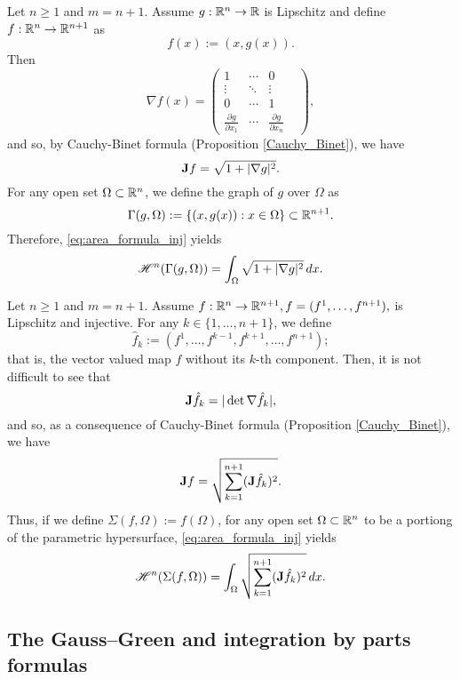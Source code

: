 \begin{example}
Let $n \ge 1$ and $m = n + 1$. Assume $g: \mathbb{R}^{n} \to \mathbb{R}$ is Lipschitz and define $f: \mathbb{R}^{n} \to \mathbb{R}^{n + 1}$ as $$f(x) := (x, g(x)).$$
Then
\[\nabla f(x) = \begin{pmatrix} 1 & \cdots & 0 & \\ \vdots & \ddots & \vdots \\ 
0 & \cdots & 1 & \\ \frac{\partial g}{\partial x_{1}} & \cdots & \frac{\partial g}{\partial x_{n}} & \end{pmatrix},\]
and so, by Cauchy-Binet formula (Proposition \ref{Cauchy_Binet}), we have
\begin{equation*}
{\bf J} f = \sqrt{1 + |\nabla g|^2}.
\end{equation*}
For any open set $\Omega \subset \mathbb{R}^{n}$, we define the graph of $g$ over $\Omega$ as
$$ \Gamma(g, \Omega) := \{ (x, g(x)) : x \in \Omega \} \subset \mathbb{R}^{n + 1}.$$
Therefore, \eqref{eq:area_formula_inj} yields
\begin{equation*}
\mathscr{H}^{n}(\Gamma(g, \Omega)) = \int_{\Omega} \sqrt{1 + |\nabla g|^{2}} \, dx.
\end{equation*}
\end{example}

\begin{example}
Let $n \ge 1$ and $m = n + 1$. Assume $f : \mathbb{R}^{n} \to \mathbb{R}^{n + 1}, f = (f^1, \dots, f^{n + 1}),$ is Lipschitz and injective. For any $k \in \{1, \dots, n + 1 \}$, we define $$\hat{f}_{k} := (f^{1}, \dots, f^{k - 1}, f^{k + 1}, \dots, f^{n + 1});$$
that is, the vector valued map $f$ without its $k$-th component. Then, it is not difficult to see that $${\bf J} \hat{f}_{k} = |\det{\nabla \hat{f}_{k}}|,$$
and so, as a consequence of Cauchy-Binet formula (Proposition \ref{Cauchy_Binet}), we have
\begin{equation*}
{\bf J} f = \sqrt{\sum_{k = 1}^{n + 1} ({\bf J} \hat{f}_{k})^{2}}.
\end{equation*}
Thus, if we define $\Sigma(f, \Omega) := f(\Omega)$, for any open set $\Omega \subset \mathbb{R}^{n}$ to be a portiong of the parametric hypersurface, \eqref{eq:area_formula_inj} yields
\begin{equation*}
\mathscr{H}^{n}(\Sigma(f, \Omega)) = \int_{\Omega} \sqrt{\sum_{k = 1}^{n + 1} ({\bf J} \hat{f}_{k})^{2}} \, dx.
\end{equation*}
\end{example}


\subsection{The Gauss--Green and integration by parts formulas}

